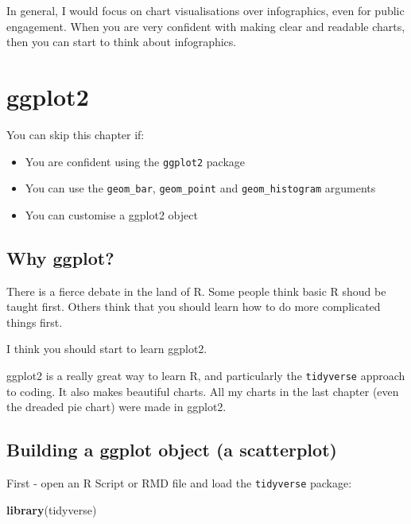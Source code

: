 \documentclass[
]{book}
\newenvironment{Shaded}{\begin{snugshade}}{\end{snugshade}}
\newcommand{\KeywordTok}[1]{\textcolor[rgb]{0.13,0.29,0.53}{\textbf{#1}}}
\newcommand{\NormalTok}[1]{#1}
\begin{document}
In general, I would focus on chart visualisations over infographics, even for public engagement. When you are very confident with making clear and readable charts, then you can start to think about infographics.

\hypertarget{ggplot}{%
\chapter{ggplot2}\label{ggplot}}

\begin{los}
You can skip this chapter if:

\begin{itemize}
\item
  You are confident using the \texttt{ggplot2} package
\item
  You can use the \texttt{geom\_bar}, \texttt{geom\_point} and
  \texttt{geom\_histogram} arguments
\item
  You can customise a ggplot2 object
\end{itemize}
\end{los}

\hypertarget{why-ggplot}{%
\section{Why ggplot?}\label{why-ggplot}}

There is a fierce debate in the land of R. Some people think basic R shoud be taught first. Others think that you should learn how to do more complicated things first.

I think you should start to learn ggplot2.

ggplot2 is a really great way to learn R, and particularly the \texttt{tidyverse} approach to coding. It also makes beautiful charts. All my charts in the last chapter (even the dreaded pie chart) were made in ggplot2.

\hypertarget{gg_build}{%
\section{Building a ggplot object (a scatterplot)}\label{gg_build}}

First - open an R Script or RMD file and load the \texttt{tidyverse} package:

\begin{Shaded}
\begin{Highlighting}[]
\KeywordTok{library}\NormalTok{(tidyverse)}
\end{Highlighting}
\end{Shaded}
\end{document}

